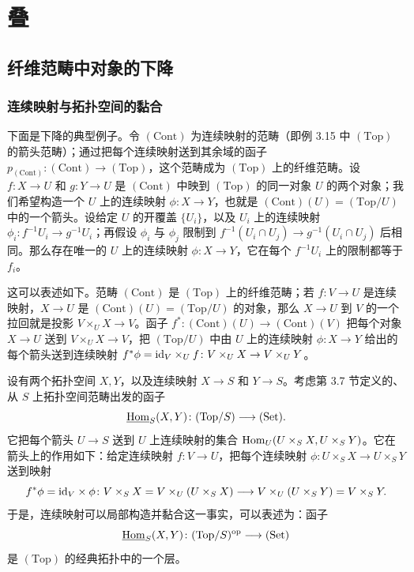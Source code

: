 \chapter{叠}\label{ch04:chapter}
\section{纤维范畴中对象的下降}\label{ch04:sec41}
\subsection{连续映射与拓扑空间的黏合}
下面是下降的典型例子。令 $(\mathrm{Cont})$ 为连续映射的范畴（即例 3.15 中 $(\mathrm{Top})$ 的箭头范畴）；通过把每个连续映射送到其余域的函子
$p_{(\mathrm{Cont})}\colon(\mathrm{Cont})\to(\mathrm{Top})$，这个范畴成为 $(\mathrm{Top})$ 上的纤维范畴。设 $f\colon X\to U$ 和 $g\colon Y\to U$ 是 $(\mathrm{Cont})$ 中映到 $(\mathrm{Top})$ 的同一对象 $U$ 的两个对象；我们希望构造一个 $U$ 上的连续映射 $\phi\colon X\to Y$，也就是 $(\mathrm{Cont})(U)=(\mathrm{Top}/U)$ 中的一个箭头。设给定 $U$ 的开覆盖 $\{U_i\}$，以及 $U_i$ 上的连续映射
$\phi_i\colon f^{-1}U_i\to g^{-1}U_i$；再假设 $\phi_i$ 与 $\phi_j$ 限制到 $f^{-1}(U_i\cap U_j)\to g^{-1}(U_i\cap U_j)$ 后相同。那么存在唯一的 $U$ 上的连续映射 $\phi\colon X\to Y$，它在每个 $f^{-1}U_i$ 上的限制都等于 $f_i$。

这可以表述如下。范畴 $(\mathrm{Cont})$ 是 $(\mathrm{Top})$ 上的纤维范畴；若 $f\colon V\to U$ 是连续映射，$X\to U$ 是 $(\mathrm{Cont})(U)=(\mathrm{Top}/U)$ 的对象，那么 $X\to U$ 到 $V$ 的一个拉回就是投影 $V\times_U X\to V$。函子
$f^*\colon(\mathrm{Cont})(U)\to(\mathrm{Cont})(V)$ 把每个对象 $X\to U$ 送到 $V\times_U X\to V$，把 $(\mathrm{Top}/U)$ 中由 $U$ 上的连续映射 $\phi\colon X\to Y$ 给出的每个箭头送到连续映射
$f^*\phi=\mathrm{id}_V\times_U f\colon V\times_U X\to V\times_U Y$。

设有两个拓扑空间 $X,Y$，以及连续映射 $X\to S$ 和 $Y\to S$。考虑第 3.7 节定义的、从 $S$ 上拓扑空间范畴出发的函子
\[
 \underline{\operatorname{Hom}}_S(X,Y)\colon(\mathrm{Top}/S)\longrightarrow(\mathrm{Set}).
\]
它把每个箭头 $U\to S$ 送到 $U$ 上连续映射的集合 $\operatorname{Hom}_U(U\times_S X,U\times_S Y)$。它在箭头上的作用如下：给定连续映射 $f\colon V\to U$，把每个连续映射 $\phi\colon U\times_S X\to U\times_S Y$ 送到映射
\[
 f^*\phi=\mathrm{id}_V\times\phi\colon
 V\times_S X=V\times_U(U\times_S X)
 \longrightarrow V\times_U(U\times_S Y)=V\times_S Y.
\]
于是，连续映射可以局部构造并黏合这一事实，可以表述为：函子
\[
 \underline{\operatorname{Hom}}_S(X,Y)\colon(\mathrm{Top}/S)^{\mathrm{op}}\longrightarrow(\mathrm{Set})
\]
是 $(\mathrm{Top})$ 的经典拓扑中的一个层。

